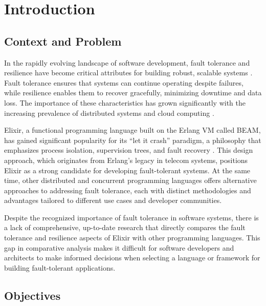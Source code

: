 % 
\chapter{Introduction} %
\label{chap:Intro} %


%
\section{Context and Problem}

In the rapidly evolving landscape of software development, fault tolerance and resilience have become critical attributes for building robust, scalable systems \cite{Kleppmann2017}. Fault tolerance ensures that systems can continue operating despite failures, while resilience enables them to recover gracefully, minimizing downtime and data loss. The importance of these characteristics has grown significantly with the increasing prevalence of distributed systems and cloud computing \cite{Tanenbaum2023,Kleppmann2017}.

Elixir, a functional programming language built on the Erlang \gls{VM} called \gls{BEAM}, has gained significant popularity for its “let it crash” paradigm, a philosophy that emphasizes process isolation, supervision trees, and fault recovery \cite{Juric2024,go-docs,Valkov2018}. This design approach, which originates from Erlang’s legacy in telecom systems, positions Elixir as a strong candidate for developing fault-tolerant systems. At the same time, other distributed and concurrent programming languages offers alternative approaches to addressing fault tolerance, each with distinct methodologies and advantages tailored to different use cases and developer communities.

Despite the recognized importance of fault tolerance in software systems, there is a lack of comprehensive, up-to-date research that directly compares the fault tolerance and resilience aspects of Elixir with other programming languages. This gap in comparative analysis makes it difficult for software developers and architects to make informed decisions when selecting a language or framework for building fault-tolerant applications.

\section{Objectives}

